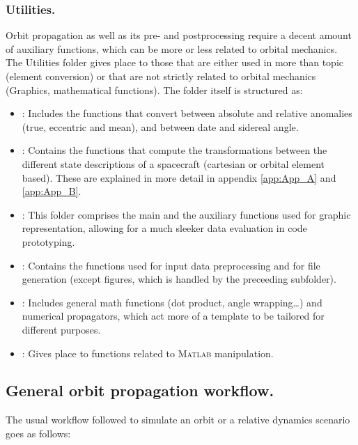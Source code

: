 		\subsubsection{Utilities.}
		\indent Orbit propagation as well as its pre- and postprocessing require a decent amount of auxiliary functions, which can be more or less related to orbital mechanics. The Utilities folder gives place to those that are either used in more than topic (\eg element conversion) or that are not strictly related to orbital mechanics (\eg Graphics, mathematical functions). The folder itself is structured as:
		\begin{itemize}
		\item[\GMVred{I.}] : Includes the functions that convert between absolute and relative anomalies (true, eccentric and mean), and between date and sidereal angle. 
		\item[\GMVred{II.}] : Contains the functions that compute the transformations between the different state descriptions of a spacecraft (cartesian or orbital element based). These are explained in more detail in appendix \ref{app:App_A} and \ref{app:App_B}.
		\item[\GMVred{III.}] : This folder comprises the main and the auxiliary functions used for graphic representation, allowing for a much sleeker data evaluation in code prototyping.
		\item[\GMVred{IV.}] : Contains the functions used for input data preprocessing and for file generation (except figures, which is handled by the preceeding subfolder).
		\item[\GMVred{V.}] : Includes general math functions (dot product, angle wrapping\ldots) and numerical propagators, which act more of a template to be tailored for different purposes.
		\item[\GMVred{VI.}] : Gives place to functions related to \textsc{Matlab} manipulation.
		\end{itemize}
	\subsection{General orbit propagation workflow.}
	\indent The usual workflow followed to simulate an orbit or a relative dynamics scenario goes as follows:
